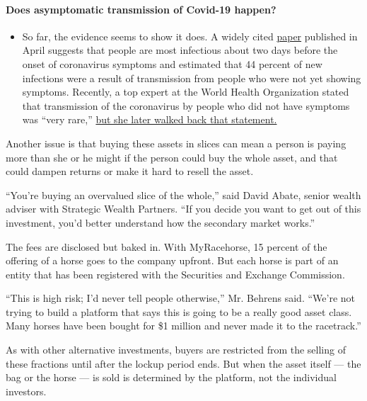 \begin{itemize}
{  \paragraph{Does asymptomatic transmission of Covid-19
  happen?}\label{does-asymptomatic-transmission-of-covid-19-happen}}

  \begin{itemize}
  \tightlist
  \item
    So far, the evidence seems to show it does. A widely cited
    \href{https://www.nature.com/articles/s41591-020-0869-5}{paper}
    published in April suggests that people are most infectious about
    two days before the onset of coronavirus symptoms and estimated that
    44 percent of new infections were a result of transmission from
    people who were not yet showing symptoms. Recently, a top expert at
    the World Health Organization stated that transmission of the
    coronavirus by people who did not have symptoms was ``very rare,''
    \href{https://www.nytimes.com/2020/06/09/world/coronavirus-updates.html?action=click\&pgtype=Article\&state=default\&region=MAIN_CONTENT_3\&context=storylines_faq\#link-1f302e21}{but
    she later walked back that statement.}
  \end{itemize}
\end{itemize}

Another issue is that buying these assets in slices can mean a person is
paying more than she or he might if the person could buy the whole
asset, and that could dampen returns or make it hard to resell the
asset.

``You're buying an overvalued slice of the whole,'' said David Abate,
senior wealth adviser with Strategic Wealth Partners. ``If you decide
you want to get out of this investment, you'd better understand how the
secondary market works.''

The fees are disclosed but baked in. With MyRacehorse, 15 percent of the
offering of a horse goes to the company upfront. But each horse is part
of an entity that has been registered with the Securities and Exchange
Commission.

``This is high risk; I'd never tell people otherwise,'' Mr. Behrens
said. ``We're not trying to build a platform that says this is going to
be a really good asset class. Many horses have been bought for \$1
million and never made it to the racetrack.''

As with other alternative investments, buyers are restricted from the
selling of these fractions until after the lockup period ends. But when
the asset itself --- the bag or the horse --- is sold is determined by
the platform, not the individual investors.

